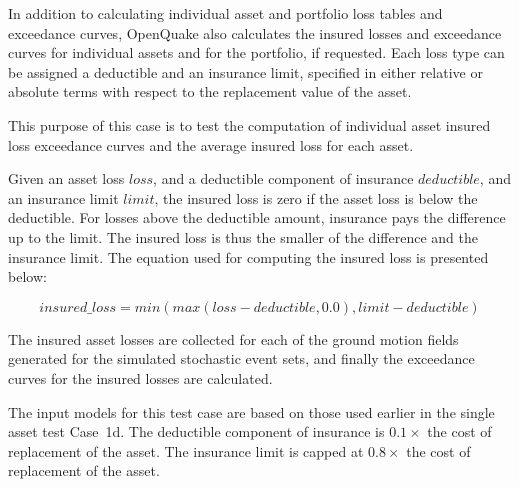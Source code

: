 In addition to calculating individual asset and portfolio loss tables and exceedance curves, OpenQuake also calculates the insured losses and exceedance curves for individual assets and for the portfolio, if requested. Each loss type can be assigned a deductible and an insurance limit, specified in either relative or absolute terms with respect to the replacement value of the asset.

This purpose of this case is to test the computation of individual asset insured loss exceedance curves and the average insured loss for each asset.

Given an asset loss $loss$, and a deductible component of insurance $deductible$, and an insurance limit $limit$, the insured loss is zero if the asset loss is below the deductible. For losses above the deductible amount, insurance pays the difference up to the limit. The insured loss is thus the smaller of the difference and the insurance limit. The equation used for computing the insured loss is presented below:

\begin{equation}
	insured\_loss = min(max(loss - deductible, 0.0), limit - deductible)
\end{equation}

The insured asset losses are collected for each of the ground motion fields generated for the simulated stochastic event sets, and finally the exceedance curves for the insured losses are calculated.

The input models for this test case are based on those used earlier in the single asset test Case~1d. The deductible component of insurance is $0.1\times$ the cost of replacement of the asset. The insurance limit is capped at $0.8\times$ the cost of replacement of the asset.